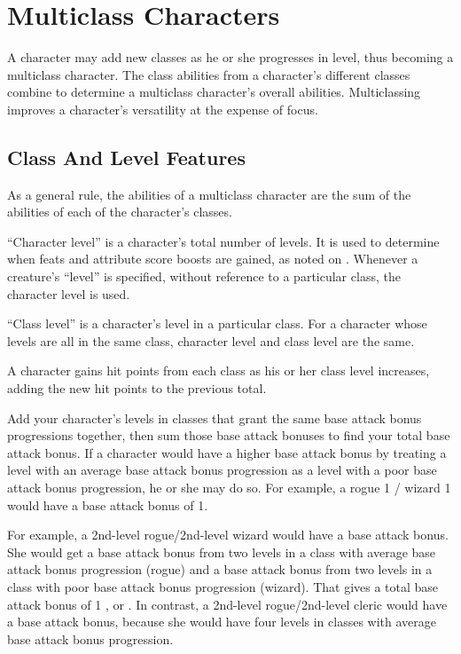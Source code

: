 \section{Multiclass Characters}\label{Multiclass Characters}
A character may add new classes as he or she progresses in level, thus becoming a multiclass character.
The class abilities from a character's different classes combine to determine a multiclass character's overall abilities.
Multiclassing improves a character's versatility at the expense of focus.

\subsection{Class And Level Features}
As a general rule, the abilities of a multiclass character are the sum
of the abilities of each of the character's classes.

``Character level'' is a character's total number of levels.
It is used to determine when feats and attribute score boosts are gained, as noted on .
Whenever a creature's ``level'' is specified, without reference to a particular class, the character level is used.

\par ``Class level'' is a character's level in a particular class.
For a character whose levels are all in the same class, character level and class level are the same.

A character gains hit points from each class as his or her class level increases, adding the new hit points to the previous total.

Add your character's levels in classes that grant the same base attack bonus progressions together, then sum those base attack bonuses to find your total base attack bonus.
If a character would have a higher base attack bonus by treating a level with an average base attack bonus progression as a level with a poor base attack bonus progression, he or she may do so.
For example, a rogue 1 / wizard 1 would have a base attack bonus of 1.

\par For example, a 2nd-level rogue/2nd-level wizard would have a  base attack bonus.
She would get a  base attack bonus from two levels in a class with average base attack bonus progression (rogue) and a  base attack bonus from two levels in a class with poor base attack bonus progression (wizard).
That gives a total base attack bonus of 1 , or .
In contrast, a 2nd-level rogue/2nd-level cleric would have a  base attack bonus, because she would have four levels in classes with average base attack bonus progression.

